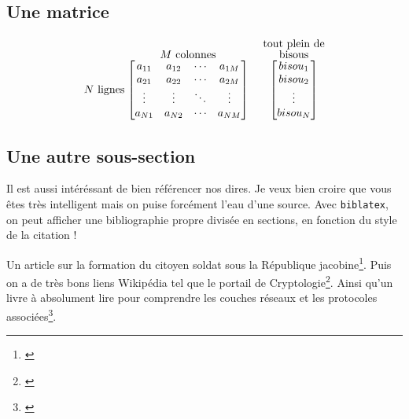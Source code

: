 \subsection{Une matrice}
\[
  N\textrm{ lignes}
  \stackrel{\mbox{$M$ colonnes}}{%
    \begin{bmatrix}
    a_{11} & a_{12} & \cdots & a_{1M} \\
    a_{21} & a_{22} & \cdots & a_{2M} \\
    \vdots & \vdots & \ddots & \vdots \\
    a_{N1} & a_{N2} & \cdots & a_{NM}
    \end{bmatrix}%
  }\ \quad
  \stackrel{\stackrel{\mbox{tout plein de}}{\mbox{bisous}}}{%
    \begin{bmatrix}
    bisou_1 \\
    bisou_2 \\
    \vdots \\
    bisou_N
    \end{bmatrix}%
   }
\]

\subsection{Une autre sous-section}
Il est aussi intéréssant de bien référencer nos dires.  Je veux bien croire que vous êtes très
intelligent mais on puise forcément l'eau d'une source. Avec \texttt{biblatex}, on peut afficher une
bibliographie propre divisée en sections, en fonction du style de la citation !

Un article sur la formation du citoyen soldat sous la République
jacobine\footnote{\cite{guiragossian:hal-02115427}}. Puis on a de très bons liens Wikipédia tel que
le portail de Cryptologie\footnote{\cite{crypto}}. Ainsi qu'un livre à absolument lire pour
comprendre les couches réseaux et les protocoles associées\footnote{\cite{topdownApproach}}.